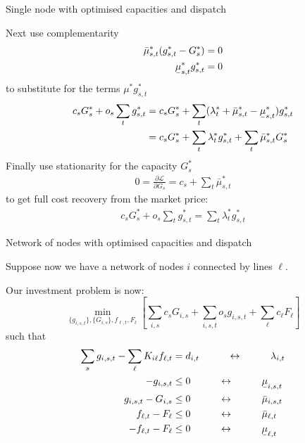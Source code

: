 \documentclass[10pt,aspectratio=169,dvipsnames]{beamer}
\def\l{\lambda}
\def\m{\mu}
\def\d{\partial}
\def\cL{\mathcal{L}}
\newcommand{\ubar}[1]{\text{\b{$#1$}}}
\begin{document}
\begin{frame}{Single node with optimised capacities and dispatch}

  Next use complementarity
  \begin{align*}
    \bar{\m}^*_{s,t}(g_{s,t}^* - G_s^*) & = 0 \\
    \ubar{\m}^*_{s,t}g_{s,t}^* & = 0
  \end{align*}
  to substitute for the terms $\m^*g_{s,t}^*$
  \begin{align*}
    c_s G_s^* +  o_{s} \sum_{t}  g_{s,t}^* & =  c_s G_s^* + \sum_{t}( \l_t^* + \bar{\m}^*_{s,t} - \ubar{\m}^*_{s,t}) g_{s,t}^* \\
    & = c_s G_s^* +  \sum_{t} \l_t^* g_{s,t}^* + \sum_t  \bar{\m}^*_{s,t} G_s^*
  \end{align*}
  Finally use stationarity for the capacity $G_s^*$
    \begin{align*}
        0 = \frac{\d \cL}{\d G_{s}}  = c_s + \sum_t \bar{\m}^*_{s,t}
  \end{align*}
  to get \alert{full cost recovery} from the market price:
  \begin{align*}
    c_s G_s^* +  o_{s} \sum_{t}  g_{s,t}^* =  \sum_{t} \l_t^* g_{s,t}^*
  \end{align*}

\end{frame}


\begin{frame}{Network of nodes with optimised capacities and dispatch}

  Suppose now we have a network of nodes $i$ connected by lines $\ell$.

  Our investment problem is now:
    \begin{equation*}
    \min_{\{g_{i,s,t}\},\{G_{i,s}\}, f_{\ell,t}, F_\ell}  \left[\sum_{i,s}c_s G_{i,s} +  \sum_{i,s,t} o_{s} g_{i,s,t}  + \sum_\ell c_\ell F_\ell \right]
  \end{equation*}
  such that
  \begin{align*}
    \sum_s g_{i,s,t} - \sum_\ell K_{i\ell}f_{\ell,t} & = d_{i,t}  \hspace{1cm}\leftrightarrow\hspace{1cm} \l_{i,t} \\
    - g_{i,s,t}  & \leq  0  \hspace{1cm}\leftrightarrow\hspace{1cm} \ubar{\m}_{i,s,t} \\
    g_{i,s,t} - G_{i,s}  & \leq 0  \hspace{1cm}\leftrightarrow\hspace{1cm} \bar{\m}_{i,s,t} \\
    f_{\ell,t} - F_\ell & \leq 0  \hspace{1cm}\leftrightarrow\hspace{1cm} \bar{\m}_{\ell,t} \\
        - f_{\ell,t} - F_\ell & \leq 0  \hspace{1cm}\leftrightarrow\hspace{1cm} \ubar{\m}_{\ell,t}
  \end{align*}


\end{frame}
\end{document}
